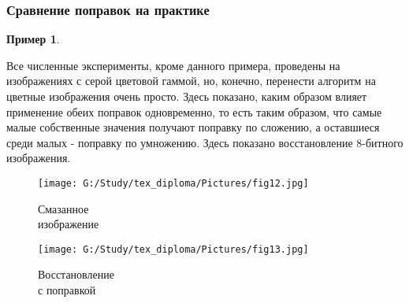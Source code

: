 \documentclass[a4paper]{article}
\theoremstyle{definition}
\newtheorem{example}{Пример}[section]
\begin{document}
\subsubsection{Сравнение поправок на практике}


\begin{example} \label{ex32}

Все численные эксперименты, кроме данного примера, проведены на изображениях с серой цветовой гаммой, но, конечно, перенести алгоритм на цветные изображения очень просто. Здесь показано, каким образом влияет применение обеих поправок одновременно, то есть таким образом, что самые малые собственные значения получают поправку по сложению, а оставшиеся среди малых - поправку по умножению. Здесь показано восстановление 8-битного изображения.

\hspace*{-\parindent}
\begin{minipage}{80mm}
    \begin{figure}[H]
            \texttt{[image: G:/Study/tex\_diploma/Pictures/fig12.jpg]}
            \label{Pic12}
            \caption[Смазанное\\изображение]{Смазанное\\изображение}
        \end{figure}
\end{minipage}
\begin{minipage}{80mm}
    \begin{figure}[H]
            \texttt{[image: G:/Study/tex\_diploma/Pictures/fig13.jpg]}
            \label{Pic13}
            \caption[Восстановление\\с поправкой]{Восстановление\\с поправкой}
        \end{figure}
\end{minipage}

\end{example}
\end{document}
